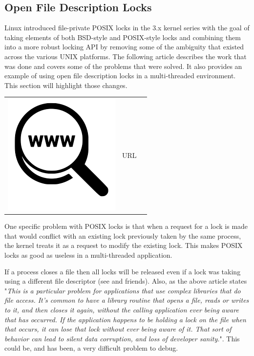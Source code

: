 
\subsection{Open File Description Locks}\label{linux-adv-locking}

Linux introduced file-private POSIX locks in the 3.x kernel series with the goal of taking elements of both BSD-style and POSIX-style locks and combining them into a more robust locking API by removing some of the ambiguity that existed across the various UNIX platforms. The following article describes the work that was done and covers some of the problems that were solved. It also provides an example of using open file description locks in a multi-threaded environment. This section will highlight those changes.

\begin{table}[h]
\begin{tabular}{lcl}
\parbox[r]{0.5in}{\includegraphics[scale=0.15]{figures/url.png}} & \parbox[l]{0.55in}{URL } & \parbox[l]{3in}{}
\end{tabular}
\end{table}

\noindent
One specific problem with POSIX locks is that when a request for a lock is made that would conflict with an existing lock previously taken by the same process, the kernel treats it as a request to modify the existing lock. This makes POSIX locks as good as useless in a multi-threaded application. 

If a process closes a file then all locks will be released even if a lock was taking using a different file descriptor (see  and friends). Also, as the above article states "\textit{This is a particular problem for applications that use complex libraries that do file access. It's common to have a library routine that opens a file, reads or writes to it, and then closes it again, without the calling application ever being aware that has occurred. If the application happens to be holding a lock on the file when that occurs, it can lose that lock without ever being aware of it. That sort of behavior can lead to silent data corruption, and loss of developer sanity.}". This could be, and has been, a very difficult problem to debug.

